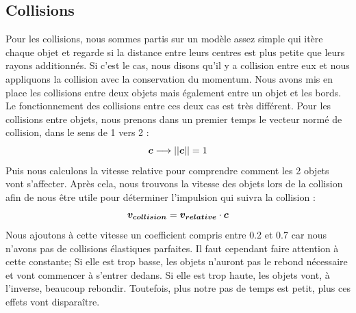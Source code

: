 \documentclass[a4paper, 11pt, oneside]{article} %
\begin{document}
    \subsection{Collisions}
        Pour les collisions, nous sommes partis sur un modèle assez simple qui itère chaque objet et regarde si la distance entre leurs centres est plus petite que leurs rayons additionnés. Si c'est le cas, nous disons qu'il y a collision entre eux et nous appliquons la collision avec la conservation du momentum. Nous avons mis en place les collisions entre deux objets mais également entre un objet et les bords. Le fonctionnement des collisions entre ces deux cas est très différent. Pour les collisions entre objets, nous prenons dans un premier temps le vecteur normé de collision, dans le sens de 1 vers 2 :
        \begin{equation}
            \vb*{c}\longrightarrow ||\vb*{c}|| = 1
        \end{equation}
        Puis nous calculons la vitesse relative pour comprendre comment les 2 objets vont s'affecter. Après cela, nous trouvons la vitesse des objets lors de la collision afin de nous être utile pour déterminer l'impulsion qui suivra la collision :
        \begin{equation}
            \vb*{v_{collision}}=\vb*{v_{relative}}\cdot\vb*{c}
        \end{equation}
        Nous ajoutons à cette vitesse un coefficient compris entre 0.2 et 0.7 car nous n'avons pas de collisions élastiques parfaites. Il faut cependant faire attention à cette constante; Si elle est trop basse, les objets n'auront pas le rebond nécessaire et vont commencer à s'entrer dedans. Si elle est trop haute, les objets vont, à l'inverse, beaucoup rebondir. Toutefois, plus notre pas de temps est petit, plus ces effets vont disparaître.
\end{document}
